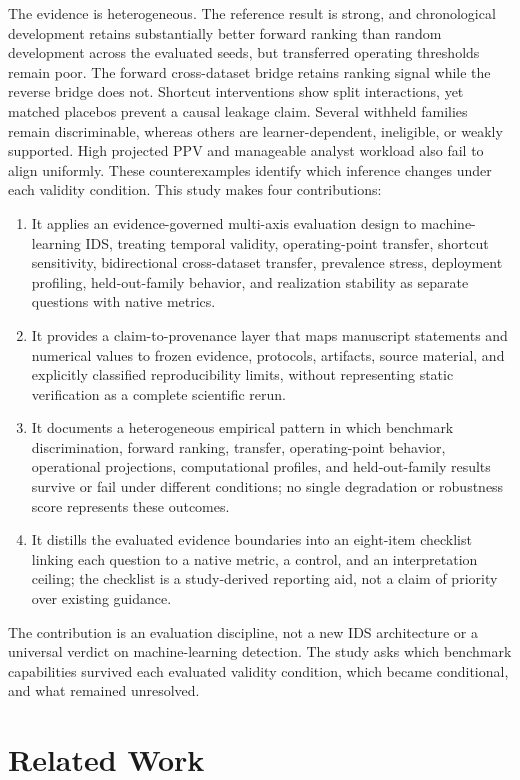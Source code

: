 \documentclass[preprint,12pt]{elsarticle}
\begin{document}
The evidence is heterogeneous. The reference result is strong, and chronological development retains substantially better forward ranking than random development across the evaluated seeds, but transferred operating thresholds remain poor. The forward cross-dataset bridge retains ranking signal while the reverse bridge does not. Shortcut interventions show split interactions, yet matched placebos prevent a causal leakage claim. Several withheld families remain discriminable, whereas others are learner-dependent, ineligible, or weakly supported. High projected PPV and manageable analyst workload also fail to align uniformly. These counterexamples identify which inference changes under each validity condition.
This study makes four contributions:
\begin{enumerate}
\item It applies an evidence-governed multi-axis evaluation design to machine-learning IDS, treating temporal validity, operating-point transfer, shortcut sensitivity, bidirectional cross-dataset transfer, prevalence stress, deployment profiling, held-out-family behavior, and realization stability as separate questions with native metrics.
\item It provides a claim-to-provenance layer that maps manuscript statements and numerical values to frozen evidence, protocols, artifacts, source material, and explicitly classified reproducibility limits, without representing static verification as a complete scientific rerun.
\item It documents a heterogeneous empirical pattern in which benchmark discrimination, forward ranking, transfer, operating-point behavior, operational projections, computational profiles, and held-out-family results survive or fail under different conditions; no single degradation or robustness score represents these outcomes.
\item It distills the evaluated evidence boundaries into an eight-item checklist linking each question to a native metric, a control, and an interpretation ceiling; the checklist is a study-derived reporting aid, not a claim of priority over existing guidance.
\end{enumerate}
The contribution is an evaluation discipline, not a new IDS architecture or a universal verdict on machine-learning detection. The study asks which benchmark capabilities survived each evaluated validity condition, which became conditional, and what remained unresolved.

\section{Related Work}
\end{document}

